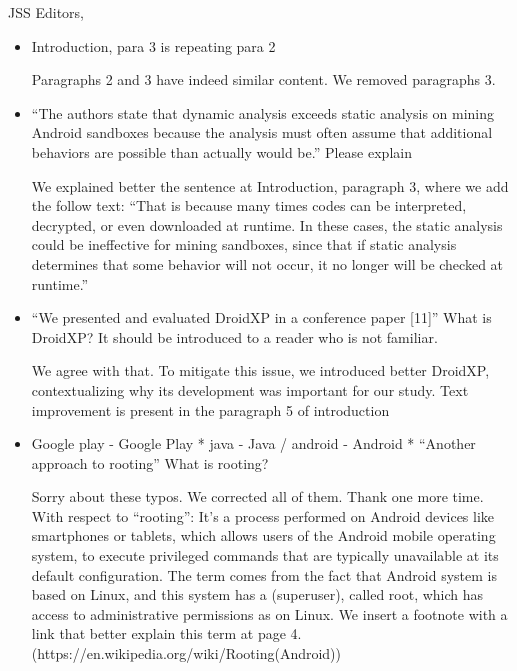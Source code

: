 \documentclass{letter}
\begin{document}
\begin{letter}{JSS Editors,}
\begin{itemize}
\vspace{0.2cm}

\item Introduction, para 3 is repeating para 2


\vspace{0.2cm}

{\color{blue}{\bf Answer:} Paragraphs 2 and 3 have indeed similar content. We removed paragraphs 3.}

\vspace{0.2cm}

\item ``The authors state that dynamic analysis exceeds static analysis on mining Android sandboxes because the
analysis must often assume that additional behaviors are possible than actually would be.''
Please explain


\vspace{0.2cm}

{\color{blue}{\bf Answer:} We explained better the sentence at Introduction, paragraph 3, where we add the follow text: ``That is because many times codes can be interpreted, decrypted, or even downloaded at runtime. In these cases, the static analysis could be ineffective for mining sandboxes, since that if static analysis determines that some behavior will not occur, it no longer will be checked at runtime.''}

\vspace{0.2cm}

\item ``We presented and evaluated DroidXP in a conference paper [11]''
What is DroidXP? It should be introduced to a reader who is not familiar.


\vspace{0.2cm}

{\color{blue}{\bf Answer:} We agree with that. To mitigate this issue, we introduced better DroidXP, contextualizing why its development was important for our study. Text improvement is present in the paragraph 5 of introduction}

\vspace{0.2cm}

\item Google play - Google Play
* java - Java / android - Android
* ``Another approach to rooting''
What is rooting?


\vspace{0.2cm}

{\color{blue}{\bf Answer:} Sorry about these typos. We corrected all of them. Thank one more time. With respect to ``rooting'': It's a process performed on Android devices like smartphones or tablets, which allows users of the Android mobile operating system, to execute privileged commands that are typically unavailable at its default configuration. The term comes from the fact that Android system is based on Linux, and this system has a (superuser), called root, which has access to administrative permissions as on Linux. We insert a footnote with a link that better explain this term at page 4.\newline
(https://en.wikipedia.org/wiki/Rooting(Android))
}


\end{itemize}
\end{letter}
\end{document}
